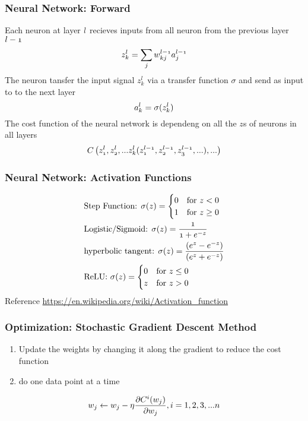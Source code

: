 \documentclass[notheorems, aspectratio=54]{beamer}
\begin{document}
\begin{frame}
\frametitle{Neural Network: Forward}
    Each neuron at layer $\mathnormal{l}$ recieves inputs from all neuron from the previous layer $\mathnormal{l-1}$
    $$
    \mathnormal{z_k^l=\sum_jw^{l-1}_{kj}a_j^{l-1}}
    $$
  	The neuron tansfer the input signal $z_k^l$ via a transfer function $\sigma$ and send as input to to the next layer
    $$
	\mathnormal{a_k^l=\sigma(z_k^l)}
    $$
    The cost function of the neural network is dependeng on all the $z$s of neurons in all layers
    $$
    \mathnormal{C\left(z^l_1, z^l_2, ... z^l_k(z^{l-1}_1, z^{l-1}_2, z^{l-1}_3, ...), ...\right)}
    $$

\end{frame}

\begin{frame}
\frametitle{Neural Network: Activation Functions}
\begin{align*}
&\text{Step Function: } \mathnormal{\sigma (z)={\begin{cases}0&{\text{for }}z<0\\1&{\text{for }}z\geq 0\end{cases}}}\\
&\text{Logistic/Sigmoid: } \mathnormal{\sigma (z)={\frac {1}{1+e^{-z}}}}\\
&\text{hyperbolic tangent: }  \mathnormal{\sigma(z)={\frac {(e^{z}-e^{-z})}{(e^{z}+e^{-z})}}}\\
&\text{ReLU: } \mathnormal{\sigma(z)={\begin{cases}0&{\text{for }}z\leq 0\\z&{\text{for }}z>0\end{cases}}}
\end{align*}
Reference \url{https://en.wikipedia.org/wiki/Activation_function}
\end{frame}



\begin{frame}
\frametitle{Optimization: Stochastic Gradient Descent Method}
\begin{enumerate}
\item Update the weights by changing it along the gradient to reduce the cost function
\item do one data point at a time
\end{enumerate}
$$\mathnormal{w_j \leftarrow w_j-\eta \frac{\partial C^i(w_j)}{\partial w_j}}, i =1, 2, 3, ...n$$
\end{frame}
\end{document}
